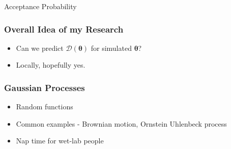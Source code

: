 \documentclass{beamer}
\begin{document}
\begin{frame}{Acceptance Probability}
    \begin{figure}
        \centering
    \end{figure}
\end{frame}

\begin{frame}
    \frametitle{Overall Idea of my Research}
    \begin{itemize}
        \item Can we predict $\mathcal{D}(\bm{\theta})$ for simulated $\bm{\theta}$?
        \item <2-> Locally, hopefully yes.
    \end{itemize}
\end{frame}

\begin{frame}
    \frametitle{Gaussian Processes}
    \begin{itemize}
        \item Random functions
        \item Common examples - Brownian motion, Ornstein Uhlenbeck process
        \item <2-> Nap time for wet-lab people
    \end{itemize}
\end{frame}
\end{document}
